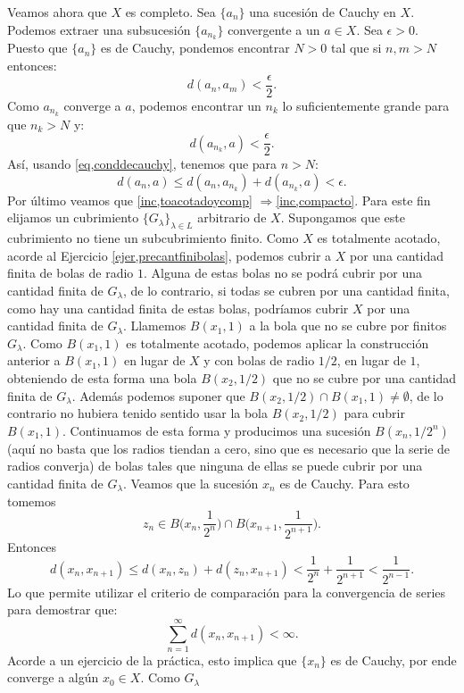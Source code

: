 \begin{demo}
Veamos ahora que $X$ es completo. Sea $\{a_n\}$ una sucesión de
Cauchy en $X$. Podemos extraer una subsucesión $\{a_{n_k}\}$
convergente a un $a\in X$. Sea $\epsilon>0$. Puesto que $\{a_n\}$
es de Cauchy, pondemos encontrar $N>0$ tal que si $n,m>N$ entonces:
\begin{equation}\label{eq,conddecauchy}
	d(a_n,a_m)<\frac{\epsilon}{2}.
\end{equation}
Como $a_{n_k}$ converge a $a$, podemos encontrar un $n_k$ lo
suficientemente
grande para que $n_k>N$ y:
\[
	d(a_{n_k},a)<\frac{\epsilon}{2}.
\]
Así, usando \eqref{eq,conddecauchy},  tenemos que para $n>N$:
\[
	d(a_n,a)\leq d(a_n,a_{n_k})+d(a_{n_k},a)<\epsilon.
\]
Por último veamos que \ref{inc,toacotadoycomp}
$\Rightarrow$\ref{inc,compacto}. Para este fin elijamos un
cubrimiento $\{G_{\lambda}\}_{\lambda\in L}$ arbitrario de $X$.
Supongamos que este cubrimiento no tiene un subcubrimiento finito.
Como $X$ es totalmente acotado, acorde al Ejercicio
\ref{ejer,precantfinibolas}, podemos cubrir a $X$ por una cantidad
finita de bolas de radio $1$. Alguna de estas bolas no se podrá
cubrir por una cantidad finita de $G_{\lambda}$, de lo contrario,
si todas se cubren por una cantidad finita, como hay una cantidad
finita de estas bolas, podríamos cubrir $X$ por una cantidad
finita de $G_{\lambda}$. Llamemos $B(x_1,1)$ a la bola que no se
cubre por finitos $G_{\lambda}$. Como $B(x_1,1)$ es totalmente
acotado, podemos aplicar la construcción anterior a $B(x_1,1)$ en
lugar de $X$ y con bolas de radio $1/2$, en lugar de $1$,
obteniendo de esta forma una bola $B(x_2,1/2)$ que no se cubre por
una cantidad finita de $G_{\lambda}$. Además podemos suponer que
$B(x_2,1/2)\cap B(x_1,1)\neq \emptyset$, de lo contrario no
hubiera tenido sentido usar la bola $B(x_2,1/2)$ para cubrir
$B(x_1,1)$. Continuamos de esta forma y producimos una sucesión
$B(x_n,1/2^n)$ (aquí no basta que los radios tiendan a cero, sino
que es necesario que la serie de radios converja) de bolas tales
que ninguna de ellas se puede cubrir por una cantidad finita de
$G_{\lambda}$. Veamos que la sucesión $x_n$ es de Cauchy.   Para
esto tomemos
\[
	z_n\in B\Big(x_n,\frac{1}{2^n}\Big)\cap B\Big(x_{n+1}
	,\frac{1}{2^{n+1}}\Big).
\]
Entonces
\[
	d(x_n,x_{n+1})\leq d(x_n,z_n)+d(z_n,x_{n+1})<
	\frac{1}{2^n}+\frac{1}{2^{n+1}}<\frac{1}{2^{n-1}}.
\]
Lo que permite utilizar el criterio de comparación para
la convergencia de series para demostrar que:
\[
	\sum\limits_{n=1}^{\infty}d(x_n,x_{n+1})<\infty.
\]
Acorde a un ejercicio de la práctica, esto implica que $\{x_n\}$ es
de Cauchy, por ende converge a algún $x_0\in X$. Como $G_{\lambda}$

\end{demo}
